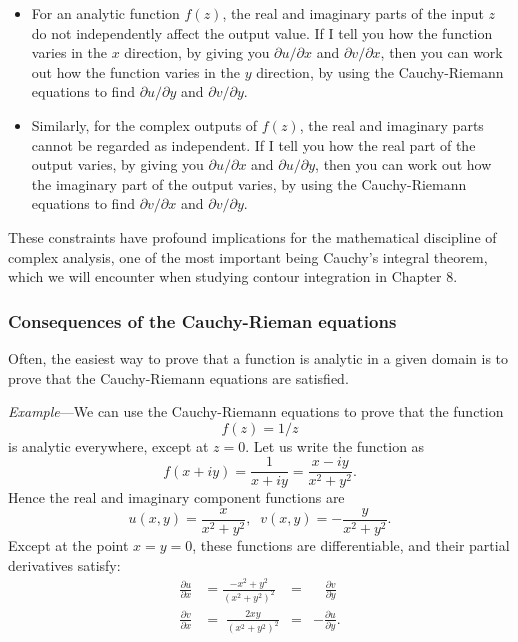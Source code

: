 \documentclass[10pt,a4paper]{article}
\begin{document}
\begin{itemize}
\item
  For an analytic function $f(z)$, the real and imaginary parts of the
  input $z$ do not independently affect the output value. If I tell
  you how the function varies in the $x$ direction, by giving you
  $\partial u/\partial x$ and $\partial v/\partial x$, then you can
  work out how the function varies in the $y$ direction, by using the
  Cauchy-Riemann equations to find $\partial u/\partial y$ and
  $\partial v/\partial y$.

\item
  Similarly, for the complex outputs of $f(z)$, the real and imaginary
  parts cannot be regarded as independent. If I tell you how the real
  part of the output varies, by giving you $\partial u/\partial x$ and
  $\partial u/\partial y$, then you can work out how the imaginary
  part of the output varies, by using the Cauchy-Riemann equations to
  find $\partial v/\partial x$ and $\partial v/\partial y$.
\end{itemize}

\noindent
These constraints have profound implications for the mathematical
discipline of complex analysis, one of the most important being
Cauchy's integral theorem, which we will encounter when studying
contour integration in Chapter 8.

\subsubsection{Consequences of the Cauchy-Rieman equations}
\label{consequences-of-the-cauchy-riemann-equations}

Often, the easiest way to prove that a function is analytic in a given
domain is to prove that the Cauchy-Riemann equations are satisfied.

\begin{framed}\noindent
  \textit{Example}---We can use the Cauchy-Riemann equations to prove
  that the function
  \begin{equation}
    f(z)=1/z
  \end{equation}
  is analytic everywhere, except at $z = 0$. Let us write the function
  as
  \begin{equation}
    f(x+iy) = \frac{1}{x+iy} = \frac{x-iy}{x^2+y^2}.
  \end{equation}
  Hence the real and imaginary component functions are
  \begin{equation}
    u(x,y) = \frac{x}{x^2+y^2}, \;\;v(x,y) = - \frac{y}{x^2+y^2}.
  \end{equation}
  Except at the point $x = y = 0$, these functions are differentiable,
  and their partial derivatives satisfy:
  \begin{align}
    \frac{\partial u}{\partial x} &= \frac{-x^2+y^2}{(x^2+y^2)^2}\!\!\!\!\!\! &=& \;\;\;\frac{\partial v}{\partial y} \\
    \frac{\partial v}{\partial x} &= \; \frac{2xy}{(x^2+y^2)^2} &=& -\frac{\partial u}{\partial y}.
  \end{align}
\end{framed}
\end{document}
